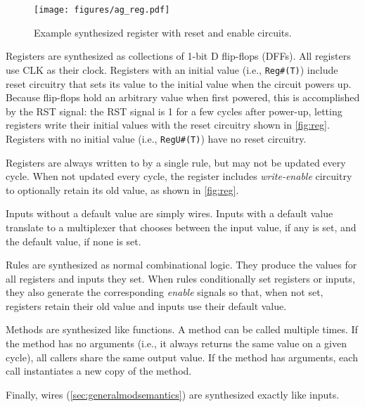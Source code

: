 \begin{wrapfigure}{r}{0.33\columnwidth}
\vspace{-2.2em}
\centering
\texttt{[image: figures/ag\_reg.pdf]}
\caption{Example synthesized register with reset and enable circuits.}
\label{fig:reg}
\vspace{-2.5em}
\end{wrapfigure}
Registers are synthesized as collections of 1-bit D flip-flops (DFFs).
All registers use CLK as their clock.
Registers with an initial value (i.e., \verb|Reg#(T)|) include reset circuitry
that sets its value to the initial value when the circuit powers up.
Because flip-flops hold an arbitrary value when first powered, this is accomplished by
the RST signal: the RST signal is 1 for a few cycles after power-up,
letting registers write their initial values with the reset circuitry shown in \autoref{fig:reg}.
Registers with no initial value (i.e., \verb|RegU#(T)|) have no reset circuitry.

Registers are always written to by a single rule, but may not be updated every cycle.
When not updated every cycle, the register includes \emph{write-enable} circuitry
to optionally retain its old value, as shown in \autoref{fig:reg}.

Inputs without a default value are simply wires.
Inputs with a default value translate to a multiplexer that chooses between
the input value, if any is set, and the default value, if none is set.

Rules are synthesized as normal combinational logic.
They produce the values for all registers and inputs they set.
When rules conditionally set registers or inputs,
they also generate the corresponding \emph{enable} signals
so that, when not set, registers retain their old value
and inputs use their default value.

Methods are synthesized like functions.
A method can be called multiple times. If the method has no arguments
(i.e., it always returns the same value on a given cycle),
all callers share the same output value. If the method has arguments,
each call instantiates a new copy of the method.

Finally, wires (\autoref{sec:generalmodsemantics})
are synthesized exactly like inputs.

